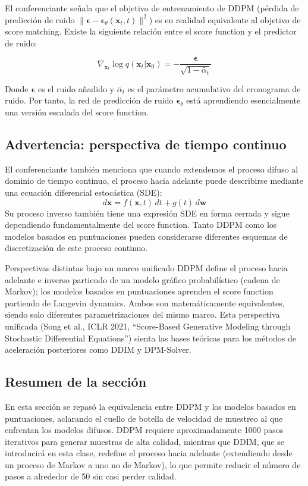 El conferenciante señala que el objetivo de entrenamiento de DDPM (pérdida de predicción de ruido $\|\boldsymbol{\epsilon} - \boldsymbol{\epsilon}_\theta(\mathbf{x}_t, t)\|^2$) es en realidad equivalente al objetivo de score matching. Existe la siguiente relación entre el score function y el predictor de ruido:

$$
\nabla_{\mathbf{x}_t} \log q(\mathbf{x}_t | \mathbf{x}_0) = -\frac{\boldsymbol{\epsilon}}{\sqrt{1 - \bar{\alpha}_t}}
$$

Donde $\boldsymbol{\epsilon}$ es el ruido añadido y $\bar{\alpha}_t$ es el parámetro acumulativo del cronograma de ruido. Por tanto, la red de predicción de ruido $\boldsymbol{\epsilon}_\theta$ está aprendiendo esencialmente una versión escalada del score function.

\subsection{Advertencia: perspectiva de tiempo continuo}

El conferenciante también menciona que cuando extendemos el proceso difuso al dominio de tiempo continuo, el proceso hacia adelante puede describirse mediante una ecuación diferencial estocástica (SDE):
$$
d\mathbf{x} = f(\mathbf{x}, t)\,dt + g(t)\,d\mathbf{w}
$$
Su proceso inverso también tiene una expresión SDE en forma cerrada y sigue dependiendo fundamentalmente del score function. Tanto DDPM como los modelos basados en puntuaciones pueden considerarse diferentes esquemas de discretización de este proceso continuo.

\begin{knowledgebox}{Perspectivas distintas bajo un marco unificado}
DDPM define el proceso hacia adelante e inverso partiendo de un modelo gráfico probabilístico (cadena de Markov); los modelos basados en puntuaciones aprenden el score function partiendo de Langevin dynamics. Ambos son matemáticamente equivalentes, siendo solo diferentes parametrizaciones del mismo marco. Esta perspectiva unificada (Song et al., ICLR 2021, ``Score-Based Generative Modeling through Stochastic Differential Equations'') sienta las bases teóricas para los métodos de aceleración posteriores como DDIM y DPM-Solver.
\end{knowledgebox}

\subsection{Resumen de la sección}

En esta sección se repasó la equivalencia entre DDPM y los modelos basados en puntuaciones, aclarando el cuello de botella de velocidad de muestreo al que enfrentan los modelos difusos. DDPM requiere aproximadamente 1000 pasos iterativos para generar muestras de alta calidad, mientras que DDIM, que se introducirá en esta clase, redefine el proceso hacia adelante (extendiendo desde un proceso de Markov a uno no de Markov), lo que permite reducir el número de pasos a alrededor de 50 sin casi perder calidad.

